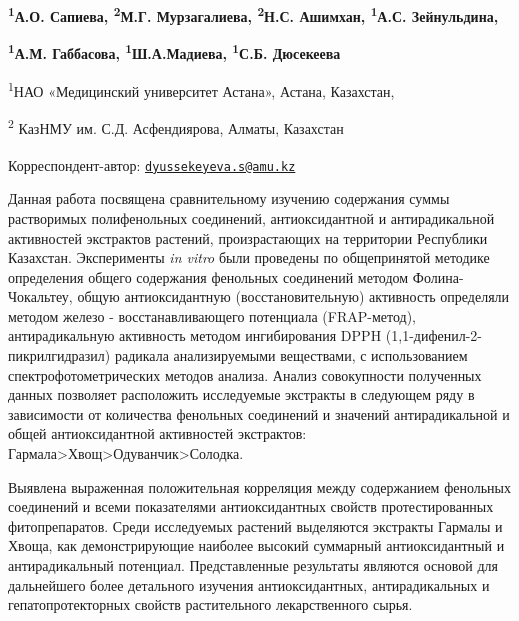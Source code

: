 
\begin{articleheader}

{\bfseries \textsuperscript{1}А.О. Сапиева, \textsuperscript{2}М.Г.
Мурзагалиева, \textsuperscript{2}Н.С. Ашимхан, \textsuperscript{1}А.С.
Зейнульдина,}

{\bfseries \textsuperscript{1}А.М. Габбасова,
\textsuperscript{1}Ш.А.Мадиева, \textsuperscript{1}С.Б.
Дюсекеева}\textsuperscript{\envelope }
\end{articleheader}

\begin{affiliation}
\textsuperscript{1}НАО «Медицинский университет Астана», Астана,
Казахстан,

\textsuperscript{2} КазНМУ им. С.Д. Асфендиярова, Алматы, Казахстан

\raggedright \textsuperscript{\envelope }Корреспондент-автор: \href{mailto:dyussekeyeva.s@amu.kz}{\nolinkurl{dyussekeyeva.s@amu.kz}}
\end{affiliation}

Данная работа посвящена сравнительному изучению содержания суммы
растворимых полифенольных соединений, антиоксидантной и антирадикальной
активностей экстрактов растений, произрастающих на территории Республики
Казахстан. Эксперименты \emph{in vitro} были проведены по общепринятой
методике определения общего содержания фенольных соединений методом
Фолина-Чокальтеу, общую антиоксидантную (восстановительную) активность
определяли методом железо - восстанавливающего потенциала (FRAP-метод),
антирадикальную активность методом ингибирования DPPH
(1,1-дифенил-2-пикрилгидразил) радикала анализируемыми веществами, с
использованием спектрофотометрических методов анализа. Анализ
совокупности полученных данных позволяет расположить исследуемые
экстракты в следующем ряду в зависимости от количества фенольных
соединений и значений антирадикальной и общей антиоксидантной
активностей экстрактов:
Гармала\textgreater Хвощ\textgreater Одуванчик\textgreater Солодка.

Выявлена выраженная положительная корреляция между содержанием фенольных
соединений и всеми показателями антиоксидантных свойств протестированных
фитопрепаратов. Среди исследуемых растений выделяются экстракты Гармалы
и Хвоща, как демонстрирующие наиболее высокий суммарный антиоксидантный
и антирадикальный потенциал. Представленные результаты являются основой
для дальнейшего более детального изучения антиоксидантных,
антирадикальных и гепатопротекторных свойств растительного
лекарственного сырья.

